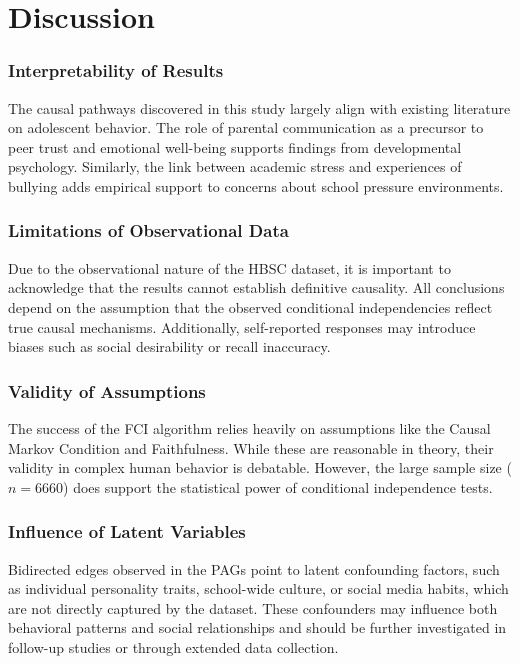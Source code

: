 \documentclass[main.tex]{subfiles}
\begin{document}
\section{Discussion}
\subsubsection*{Interpretability of Results}
The causal pathways discovered in this study largely align with existing literature on adolescent behavior. The role of parental communication as a precursor to peer trust and emotional well-being supports findings from developmental psychology. Similarly, the link between academic stress and experiences of bullying adds empirical support to concerns about school pressure environments.

\subsubsection*{Limitations of Observational Data}
Due to the observational nature of the HBSC dataset, it is important to acknowledge that the results cannot establish definitive causality. All conclusions depend on the assumption that the observed conditional independencies reflect true causal mechanisms. Additionally, self-reported responses may introduce biases such as social desirability or recall inaccuracy.

\subsubsection*{Validity of Assumptions}
The success of the FCI algorithm relies heavily on assumptions like the Causal Markov Condition and Faithfulness. While these are reasonable in theory, their validity in complex human behavior is debatable. However, the large sample size ($n=6660$) does support the statistical power of conditional independence tests.

\subsubsection*{Influence of Latent Variables}
Bidirected edges observed in the PAGs point to latent confounding factors, such as individual personality traits, school-wide culture, or social media habits, which are not directly captured by the dataset. These confounders may influence both behavioral patterns and social relationships and should be further investigated in follow-up studies or through extended data collection.
\end{document}
